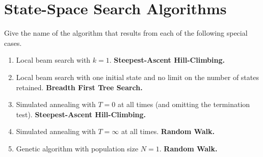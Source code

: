 \documentclass[12pt]{scrartcl}
\begin{document}
\maketitle

\section{State-Space Search Algorithms}
\begin{statement}
    Give the name of the algorithm that results from each of the following special cases.
\end{statement}

\begin{enumerate}
    \item Local beam search with $k = 1$. \textbf{Steepest-Ascent Hill-Climbing.}
    \item Local beam search with one initial state and no limit on the number of states retained. \textbf{Breadth First Tree Search.}
    \item Simulated annealing with $T = 0$ at all times (and omitting the termination test). \textbf{Steepest-Ascent Hill-Climbing.}
    \item Simulated annealing with $T = \infty$ at all times. \textbf{Random Walk.}
    \item Genetic algorithm with population size $N = 1$. \textbf{Random Walk.}
\end{enumerate}
\end{document}
